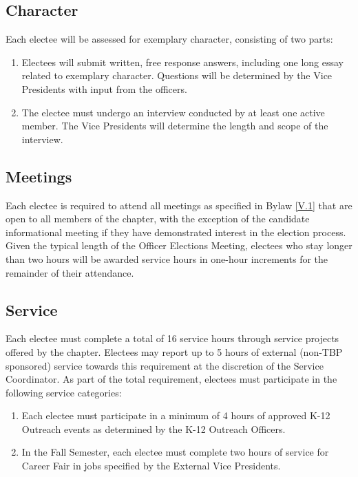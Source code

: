 \subsection{Character} \label{A.1}

Each electee will be assessed for exemplary character, consisting of two parts:
\begin{enumerate}
    \item {} Electees will submit written, free response answers, including one long essay related to exemplary character. 
    Questions will be determined by the Vice Presidents with input from the officers.
    \item {} The electee must undergo an interview conducted by at least one active member. The Vice Presidents will determine the length and scope of the interview. 
\end{enumerate}

\subsection{Meetings} \label{A.2}

Each electee is required to attend all meetings as specified in Bylaw \ref{V.1} that are open to all members of the chapter, with the exception of the 
candidate informational meeting if they have demonstrated interest in the election process. Given the typical length of the Officer Elections Meeting, 
electees who stay longer than two hours will be awarded service hours in one-hour increments for the remainder of their attendance.

\subsection{Service} \label{A.3}

Each electee must complete a total of 16 service hours through service projects offered by the chapter. 
Electees may report up to 5 hours of external (non-TBP sponsored) service towards this requirement at the discretion of the Service Coordinator. 
As part of the total requirement, electees must participate in the following service categories:
\begin{enumerate}
    \item {} Each electee must participate in a minimum of 4 hours of approved K-12 Outreach events as determined by the K-12 Outreach Officers.
    \item {} In the Fall Semester, each electee must complete two hours of service for Career Fair in jobs specified by the External Vice Presidents.
\end{enumerate}

